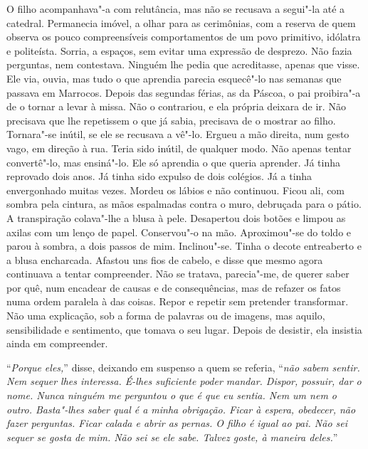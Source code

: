 O filho acompanhava"-a com relutância, mas não se recusava a segui"-la
até a catedral. Permanecia imóvel, a olhar para as cerimônias, com a
reserva de quem observa os pouco compreensíveis comportamentos de um
povo primitivo, idólatra e politeísta. Sorria, a espaços, sem evitar uma
expressão de desprezo. Não fazia perguntas, nem contestava. Ninguém lhe
pedia que acreditasse, apenas que visse. Ele via, ouvia, mas tudo o que
aprendia parecia esquecê"-lo nas semanas que passava em Marrocos. Depois
das segundas férias, as da Páscoa, o pai proibira"-a de o tornar a levar
à missa. Não o contrariou, e ela própria deixara de ir. Não precisava
que lhe repetissem o que já sabia, precisava de o mostrar ao filho.
Tornara"-se inútil, se ele se recusava a vê"-lo. Ergueu a mão direita,
num gesto vago, em direção à rua. Teria sido inútil, de qualquer modo.
Não apenas tentar convertê"-lo, mas ensiná"-lo. Ele só aprendia o que
queria aprender. Já tinha reprovado dois anos. Já tinha sido expulso de
dois colégios. Já a tinha envergonhado muitas vezes. Mordeu os lábios e
não continuou. Ficou ali, com sombra pela cintura, as mãos espalmadas
contra o muro, debruçada para o pátio. A transpiração colava"-lhe a
blusa à pele. Desapertou dois botões e limpou as axilas com um lenço de
papel. Conservou"-o na mão. Aproximou"-se do toldo e parou à sombra, a
dois passos de mim. Inclinou"-se. Tinha o decote entreaberto e a blusa
encharcada. Afastou uns fios de cabelo, e disse que mesmo agora
continuava a tentar compreender. Não se tratava, parecia"-me, de querer
saber por quê, num encadear de causas e de consequências, mas de refazer
os fatos numa ordem paralela à das coisas. Repor e repetir sem
pretender transformar. Não uma explicação, sob a forma de palavras ou de
imagens, mas aquilo, sensibilidade e sentimento, que tomava o seu lugar.
Depois de desistir, ela insistia ainda em compreender.

``\emph{Porque eles,}''
disse, deixando em suspenso a quem se referia,
``\emph{não sabem sentir. Nem sequer lhes interessa. É-lhes suficiente
poder mandar. Dispor, possuir, dar o nome. Nunca ninguém me perguntou o
que é que eu sentia. Nem um nem o outro. Basta"-lhes saber qual é a
minha obrigação. Ficar à espera, obedecer, não fazer perguntas. Ficar
calada e abrir as pernas. O filho é igual ao pai. Não sei sequer se
gosta de mim. Não sei se ele sabe. Talvez goste, à maneira deles.}''

